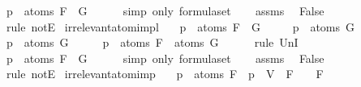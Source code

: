 \begin{isabellebody}
\ {\isachardoublequoteopen}p\ {\isasymin}\ atoms\ {\isacharparenleft}F\ \isactrlbold {\isasymrightarrow}\ G{\isacharparenright}{\isachardoublequoteclose}\isanewline
\ \ \ \ \isamarkupfalse%
\ {\isacharparenleft}simp\ only{\isacharcolon}\ formula{\isachardot}set{\isacharparenleft}{}{\isacharparenright}{\isacharparenright}\isanewline
\ \ \isamarkupfalse%
\ assms\ \isamarkupfalse%
\ False\ \isanewline
\ \ \ \ \isamarkupfalse%
\ {\isacharparenleft}rule\ notE{\isacharparenright}\isanewline
{}\isamarkupfalse%
%
\endisatagproof
{\isafoldproof}%
%
\isadelimproof
\isanewline
%
\endisadelimproof
\isanewline
{}\isamarkupfalse%
\ irrelevant{\isacharunderscore}atom{\isacharunderscore}imp{\isacharunderscore}l{}{\isacharcolon}\isanewline
\ \ \ {\isachardoublequoteopen}p\ {\isasymnotin}\ atoms\ {\isacharparenleft}F\ \isactrlbold {\isasymrightarrow}\ G{\isacharparenright}{\isachardoublequoteclose}\isanewline
\ \ \ \ \ {\isachardoublequoteopen}p\ {\isasymnotin}\ atoms\ G{\isachardoublequoteclose}\isanewline
%
\isadelimproof
%
\endisadelimproof
%
\isatagproof
{}\isamarkupfalse%
\ \isanewline
\ \ \isamarkupfalse%
\ {\isachardoublequoteopen}p\ {\isasymin}\ atoms\ G{\isachardoublequoteclose}\isanewline
\ \ \isamarkupfalse%
\ \isamarkupfalse%
\ {\isachardoublequoteopen}p\ {\isasymin}\ atoms\ F\ {\isasymunion}\ atoms\ G{\isachardoublequoteclose}\isanewline
\ \ \ \ \isamarkupfalse%
\ {\isacharparenleft}rule\ UnI{}{\isacharparenright}\isanewline
\ \ \isamarkupfalse%
\ \isamarkupfalse%
\ {\isachardoublequoteopen}p\ {\isasymin}\ atoms\ {\isacharparenleft}F\ \isactrlbold {\isasymrightarrow}\ G{\isacharparenright}{\isachardoublequoteclose}\isanewline
\ \ \ \ \isamarkupfalse%
\ {\isacharparenleft}simp\ only{\isacharcolon}\ formula{\isachardot}set{\isacharparenleft}{}{\isacharparenright}{\isacharparenright}\isanewline
\ \ \isamarkupfalse%
\ assms\ \isamarkupfalse%
\ False\ \isanewline
\ \ \ \ \isamarkupfalse%
\ {\isacharparenleft}rule\ notE{\isacharparenright}\isanewline
{}\isamarkupfalse%
%
\endisatagproof
{\isafoldproof}%
%
\isadelimproof
\isanewline
%
\endisadelimproof
\isanewline
{}\isamarkupfalse%
\ irrelevant{\isacharunderscore}atom{\isacharunderscore}imp{\isacharcolon}\isanewline
\ \ \ {\isachardoublequoteopen}p\ {\isasymnotin}\ atoms\ F\ {\isasymLongrightarrow}\ {\isasymA}{\isacharparenleft}p\ {\isacharcolon}{\isacharequal}\ V{\isacharparenright}\ {\isasymTurnstile}\ F\ {\isasymlongleftrightarrow}\ {\isasymA}\ {\isasymTurnstile}\ F{\isachardoublequoteclose}\isanewline

\end{isabellebody}
